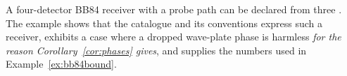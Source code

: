 
A four-detector BB84 receiver with a probe path can be declared from three
. The example shows that the catalogue and its conventions
express such a receiver, exhibits a case where a dropped wave-plate phase is
harmless \emph{for the reason Corollary~\ref{cor:phases} gives}, and supplies
the numbers used in Example~\ref{ex:bb84bound}.

